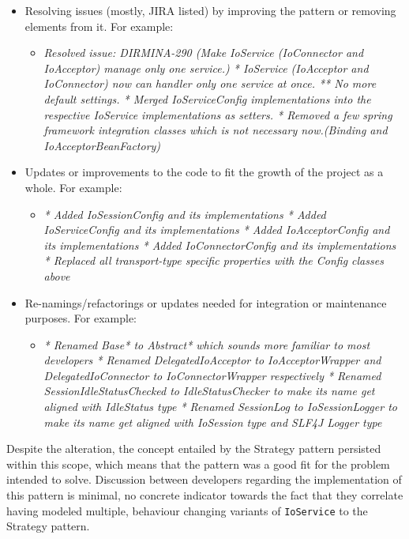 \begin{itemize}
    \item Resolving issues (mostly, JIRA listed) by improving the pattern or removing elements from it. For example:
        \begin{itemize}
            \item \textit{Resolved issue: DIRMINA-290 (Make IoService (IoConnector and IoAcceptor) manage only one service.)
* IoService (IoAcceptor and IoConnector) now can handler only one service at once.
** No more default settings.
* Merged IoServiceConfig implementations into the respective IoService implementations as setters.
* Removed a few spring framework integration classes which is not necessary now.(Binding and IoAcceptorBeanFactory)}
        \end{itemize}
    \item Updates or improvements to the code to fit the growth of the project as a whole. For example:
        \begin{itemize}
            \item \textit{* Added IoSessionConfig and its implementations
* Added IoServiceConfig and its implementations
* Added IoAcceptorConfig and its implementations
* Added IoConnectorConfig and its implementations
* Replaced all transport-type specific properties with the Config classes above}
        \end{itemize}
    \item Re-namings/refactorings or updates needed for integration or maintenance purposes. For example:
        \begin{itemize}
            \item \textit{* Renamed Base* to Abstract* which sounds more familiar to most developers
* Renamed DelegatedIoAcceptor to IoAcceptorWrapper and DelegatedIoConnector to IoConnectorWrapper respectively
* Renamed SessionIdleStatusChecked to IdleStatusChecker to make its name get aligned with IdleStatus type
* Renamed SessionLog to IoSessionLogger to make its name get aligned with IoSession type and SLF4J Logger type}
        \end{itemize}
\end{itemize}
Despite the alteration, the concept entailed by the Strategy pattern persisted within this scope, which means that the pattern was a good fit for the problem intended to solve. Discussion between developers regarding the implementation of this pattern is minimal, no concrete indicator towards the fact that they correlate having modeled multiple, behaviour changing variants of \texttt{IoService} to the Strategy pattern.\\\\
